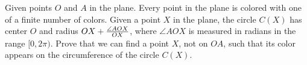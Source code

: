 Given points $O$ and $A$ in the plane. Every point in the plane is colored with one of a finite number of colors. Given a point $X$ in the plane, the circle $C(X)$ has center $O$ and radius $OX+{\angle AOX\over OX}$,  where $\angle AOX$ is measured in radians in the range $[0,2\pi)$. Prove that we can find a point $X$,  not on $OA$,  such that its color appears on the circumference of the circle $C(X)$.